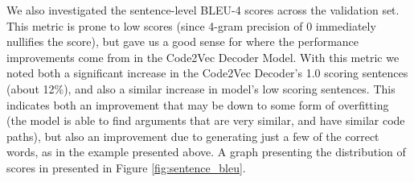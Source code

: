 We also investigated the sentence-level BLEU-4 scores across the validation set. This metric is prone to low scores (since 4-gram precision of 0 immediately nullifies the score), but gave us a good sense for where the performance improvements come from in the Code2Vec Decoder Model.
With this metric we noted both a significant increase in the Code2Vec Decoder's 1.0 scoring sentences (about 12\%), and also a similar increase in model's low scoring sentences.
This indicates both an improvement that may be down to some form of overfitting (the model is able to find arguments that are very similar, and have similar code paths), but also an improvement due to generating just a few of the correct words, as in the example presented above. A graph presenting the distribution of scores in presented in Figure \ref{fig:sentence_bleu}.





